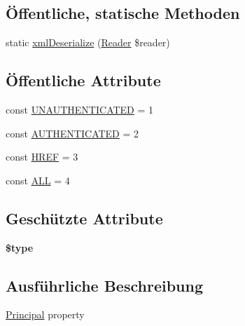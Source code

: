 \subsection*{Öffentliche, statische Methoden}
\begin{DoxyCompactItemize}
\item 
static \mbox{\hyperlink{class_sabre_1_1_d_a_v_a_c_l_1_1_xml_1_1_property_1_1_principal_a388eb5914cdc0d2007375350cdcc327e}{xml\+Deserialize}} (\mbox{\hyperlink{class_sabre_1_1_xml_1_1_reader}{Reader}} \$reader)
\end{DoxyCompactItemize}
\subsection*{Öffentliche Attribute}
\begin{DoxyCompactItemize}
\item 
const \mbox{\hyperlink{class_sabre_1_1_d_a_v_a_c_l_1_1_xml_1_1_property_1_1_principal_a76758eb0455c764ff35139c4818dbc29}{U\+N\+A\+U\+T\+H\+E\+N\+T\+I\+C\+A\+T\+ED}} = 1
\item 
const \mbox{\hyperlink{class_sabre_1_1_d_a_v_a_c_l_1_1_xml_1_1_property_1_1_principal_ae3501e54f61497a858c6a02ddf27d782}{A\+U\+T\+H\+E\+N\+T\+I\+C\+A\+T\+ED}} = 2
\item 
const \mbox{\hyperlink{class_sabre_1_1_d_a_v_a_c_l_1_1_xml_1_1_property_1_1_principal_ac77333c53023061bdd51e991845ca2bd}{H\+R\+EF}} = 3
\item 
const \mbox{\hyperlink{class_sabre_1_1_d_a_v_a_c_l_1_1_xml_1_1_property_1_1_principal_a8522507e167128f97914f5927631b20b}{A\+LL}} = 4
\end{DoxyCompactItemize}
\subsection*{Geschützte Attribute}
\begin{DoxyCompactItemize}
\item 
\mbox{\label{class_sabre_1_1_d_a_v_a_c_l_1_1_xml_1_1_property_1_1_principal_a4e6b06cdeaf73b0cfce6e20a1b7d02dd}} 
{\bfseries \$type}
\end{DoxyCompactItemize}


\subsection{Ausführliche Beschreibung}
\mbox{\hyperlink{class_sabre_1_1_d_a_v_a_c_l_1_1_xml_1_1_property_1_1_principal}{Principal}} property

